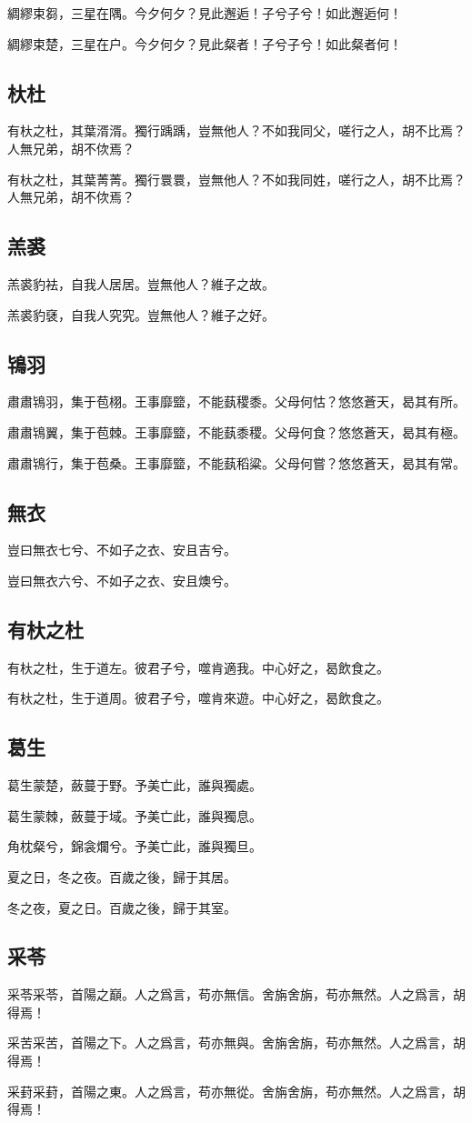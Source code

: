 綢繆束芻，三星在隅。今夕何夕？見此邂逅！子兮子兮！如此邂逅何！

綢繆束楚，三星在户。今夕何夕？見此粲者！子兮子兮！如此粲者何！

\subsection[杕杜]{杕杜}

有杕之杜，其葉湑湑。獨行踽踽，豈無他人？不如我同父，嗟行之人，胡不比焉？人無兄弟，胡不佽焉？

有杕之杜，其葉菁菁。獨行睘睘，豈無他人？不如我同姓，嗟行之人，胡不比焉？人無兄弟，胡不佽焉？

\subsection[羔裘]{羔裘}

羔裘豹袪，自我人居居。豈無他人？維子之故。

羔裘豹褎，自我人究究。豈無他人？維子之好。

\subsection[鴇羽]{鴇羽}

肅肅鴇羽，集于苞栩。王事靡盬，不能蓺稷黍。父母何怙？悠悠蒼天，曷其有所。

肅肅鴇翼，集于苞棘。王事靡盬，不能蓺黍稷。父母何食？悠悠蒼天，曷其有極。

肅肅鴇行，集于苞桑。王事靡盬，不能蓺稻粱。父母何嘗？悠悠蒼天，曷其有常。

\subsection[無衣]{無衣}

豈曰無衣七兮、不如子之衣、安且吉兮。

豈曰無衣六兮、不如子之衣、安且燠兮。

\subsection[有杕之杜]{有杕之杜}

有杕之杜，生于道左。彼君子兮，噬肯適我。中心好之，曷飲食之。

有杕之杜，生于道周。彼君子兮，噬肯來遊。中心好之，曷飲食之。

\subsection[葛生]{葛生}

葛生蒙楚，蘞蔓于野。予美亡此，誰與獨處。

葛生蒙棘，蘞蔓于域。予美亡此，誰與獨息。

角枕粲兮，錦衾爛兮。予美亡此，誰與獨旦。

夏之日，冬之夜。百歲之後，歸于其居。

冬之夜，夏之日。百歲之後，歸于其室。

\subsection[采苓]{采苓}

采苓采苓，首陽之巔。人之爲言，苟亦無信。舍旃舍旃，苟亦無然。人之爲言，胡得焉！

采苦采苦，首陽之下。人之爲言，苟亦無與。舍旃舍旃，苟亦無然。人之爲言，胡得焉！

采葑采葑，首陽之東。人之爲言，苟亦無從。舍旃舍旃，苟亦無然。人之爲言，胡得焉！
